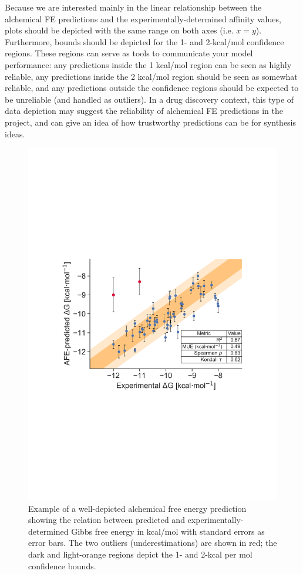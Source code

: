 \documentclass[9pt,bestpractices]{livecoms}
\begin{document}
Because we are interested mainly in the linear relationship between the alchemical FE predictions and the experimentally-determined affinity values, plots should be depicted with the same range on both axes (i.e. $x=y$). Furthermore, bounds should be depicted for the 1- and 2-kcal/mol confidence regions. These regions can serve as tools to communicate your model performance: any predictions inside the 1 kcal/mol region can be seen as highly reliable, any predictions inside the 2 kcal/mol region should be seen as somewhat reliable, and any predictions outside the confidence regions should be expected to be unreliable (and handled as outliers). In a drug discovery context, this type of data depiction may suggest the reliability of alchemical FE predictions in the project, and can give an idea of how trustworthy predictions can be for synthesis ideas. 
\begin{figure}
    \includegraphics[width=0.95\linewidth]{figures/fig13_analysis_practices/Figure.pdf}
    \caption{Example of a well-depicted alchemical free energy prediction showing the relation between predicted and experimentally-determined Gibbs free energy in kcal/mol with standard errors as error bars. The two outliers (underestimations) are shown in red; the dark and light-orange regions depict the 1- and 2-kcal per mol confidence bounds.}
    \label{fig:scatterplot_analysis}
\end{figure}
\end{document}

